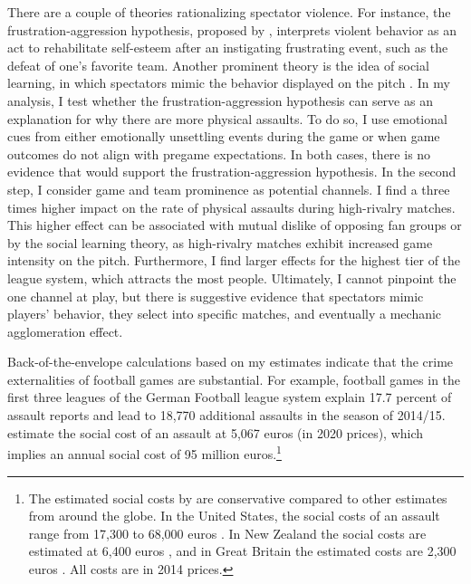 There are a couple of theories rationalizing spectator violence. For instance, the frustration-aggression hypothesis, proposed by \cite{dollard1939frustration}, interprets violent behavior as an act to rehabilitate self-esteem after an instigating frustrating event, such as the defeat of one's favorite team. Another prominent theory is the idea of social learning, in which spectators mimic the behavior displayed on the pitch \citep{bandura1973aggression, bandura2007social}. In my analysis, I test whether the frustration-aggression hypothesis can serve as an explanation for why there are more physical assaults. To do so, I use emotional cues from either emotionally unsettling events during the game or when game outcomes do not align with pregame expectations. In both cases, there is no evidence that would support the frustration-aggression hypothesis. In the second step, I consider game and team prominence as potential channels. I find a three times higher impact on the rate of physical assaults during high-rivalry matches. This higher effect can be associated with mutual dislike of opposing fan groups or by the social learning theory, as high-rivalry matches exhibit increased game intensity on the pitch. Furthermore, I find larger effects for the highest tier of the league system, which attracts the most people. Ultimately, I cannot pinpoint the one channel at play, but there is suggestive evidence that spectators mimic players' behavior, they select into specific matches, and eventually a mechanic agglomeration effect. 



Back-of-the-envelope calculations based on my estimates indicate that the crime externalities of football games are substantial. For example, football games in the first three leagues of the German Football league system explain 17.7 percent of assault reports and lead to 18,770 additional assaults in the season of 2014/15. \cite{glaubitz2016kostet} estimate the social cost of an assault at 5,067 euros (in 2020 prices), which implies an annual social cost of 95 million euros.\footnote{The estimated social costs by \cite{glaubitz2016kostet} are conservative compared to other estimates from around the globe. In the United States, the social costs of an assault range from 17,300 to 68,000 euros \citep{miller1996victim,cohen2004willingness}. In New Zealand the social costs are estimated at 6,400 euros \citep{roper2006estimating}, and in Great Britain the estimated costs are 2,300 euros \citep{dubourg2005economic}. All costs are in 2014 prices.}



